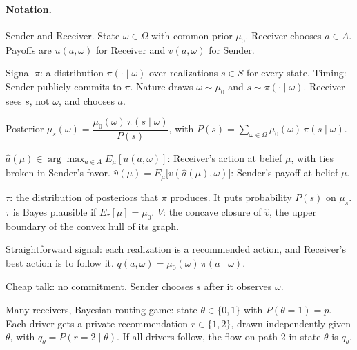 \documentclass{article}
\begin{document}
\paragraph{Notation.}
Sender and Receiver. State $\omega\in\Omega$ with common prior $\mu_0$. Receiver chooses $a\in A$. Payoffs are $u(a,\omega)$ for Receiver and $v(a,\omega)$ for Sender.

Signal $\pi$: a distribution $\pi(\cdot\mid\omega)$ over realizations $s\in S$ for every state.
Timing: Sender publicly commits to $\pi$. Nature draws $\omega\sim\mu_0$ and $s\sim\pi(\cdot\mid\omega)$. Receiver sees $s$, not $\omega$, and chooses $a$.

Posterior $\mu_s(\omega)=\dfrac{\mu_0(\omega)\,\pi(s\mid\omega)}{P(s)}$, with $P(s)=\sum_{\omega\in\Omega}\mu_0(\omega)\,\pi(s\mid\omega)$.

$\hat a(\mu)\in\arg\max_{a\in A}E_\mu[u(a,\omega)]$: Receiver's action at belief $\mu$, with ties broken in Sender's favor.
$\hat v(\mu)=E_\mu\big[v(\hat a(\mu),\omega)\big]$: Sender's payoff at belief $\mu$.

$\tau$: the distribution of posteriors that $\pi$ produces. It puts probability $P(s)$ on $\mu_s$.
$\tau$ is Bayes plausible if $E_\tau[\mu]=\mu_0$.
$V$: the concave closure of $\hat v$, the upper boundary of the convex hull of its graph.

Straightforward signal: each realization is a recommended action, and Receiver's best action is to follow it. $q(a,\omega)=\mu_0(\omega)\,\pi(a\mid\omega)$.

Cheap talk: no commitment. Sender chooses $s$ after it observes $\omega$.

Many receivers, Bayesian routing game: state $\theta\in\{0,1\}$ with $P(\theta=1)=p$. Each driver gets a private recommendation $r\in\{1,2\}$, drawn independently given $\theta$, with $q_\theta=P(r=2\mid\theta)$. If all drivers follow, the flow on path 2 in state $\theta$ is $q_\theta$.
\end{document}
